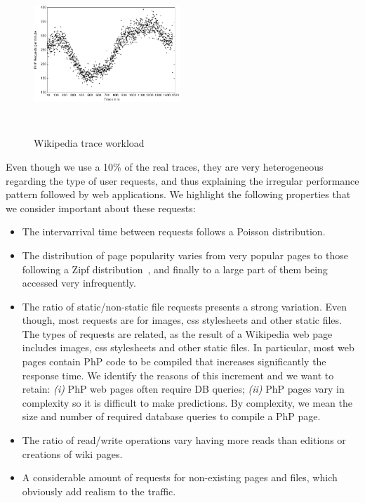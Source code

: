 \begin{figure}
\begin{center}
\includegraphics[width=0.49\textwidth, height=6cm]{./images/traceWorkload}
\end{center}
\caption{Wikipedia trace workload}
\label{workload}
\end{figure}

Even though we use a 10\% of the real traces, they are very heterogeneous regarding the type of user requests, and thus explaining the irregular performance pattern followed by web applications. 
We highlight the following properties that we consider important about these requests: 

\begin{itemize}
\item The intervarrival time between requests follows a Poisson distribution.

\item The distribution of page popularity varies from very popular pages to those following a Zipf distribution~\cite{}, and finally to a large part of them being accessed very infrequently.

\item The ratio of static/non-static file requestspresents a strong variation. Even though, most requests are for images, css stylesheets and other static files. The types of requests are related, as the result of a Wikipedia web page includes images, css stylesheets and other static files. In particular, most web pages contain PhP code to be compiled that increases significantly the response time. We identify the reasons of this increment and we want to retain: \emph{(i)} PhP web pages often require DB queries; \emph{(ii)} PhP pages vary in complexity so it is difficult to make predictions. By complexity, we mean the size and number of required database queries to compile a PhP page.

\item The ratio of read/write operations vary having more reads than editions or creations of wiki pages.

\item A considerable amount of requests for non-existing pages and files, which obviously add realism to the traffic.

\end{itemize}


